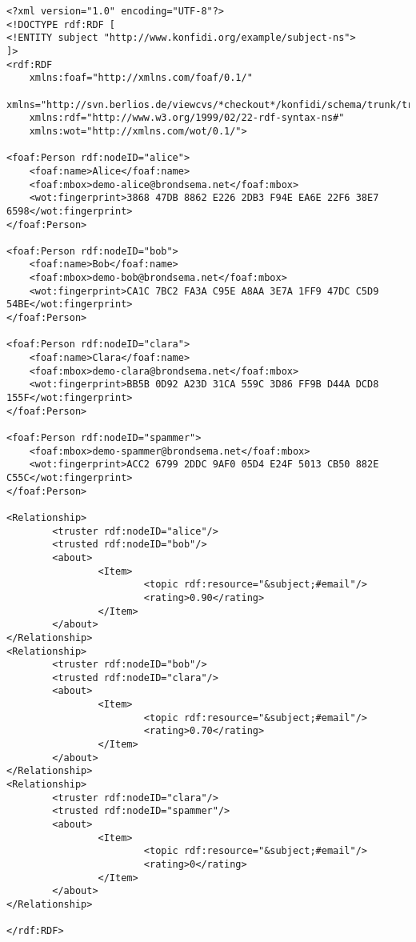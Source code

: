 \begin{verbatim}
<?xml version="1.0" encoding="UTF-8"?>
<!DOCTYPE rdf:RDF [
<!ENTITY subject "http://www.konfidi.org/example/subject-ns">
]>
<rdf:RDF
    xmlns:foaf="http://xmlns.com/foaf/0.1/"
    xmlns="http://svn.berlios.de/viewcvs/*checkout*/konfidi/schema/trunk/trust.owl#"
    xmlns:rdf="http://www.w3.org/1999/02/22-rdf-syntax-ns#"
    xmlns:wot="http://xmlns.com/wot/0.1/">

<foaf:Person rdf:nodeID="alice"> 
    <foaf:name>Alice</foaf:name>
    <foaf:mbox>demo-alice@brondsema.net</foaf:mbox>
    <wot:fingerprint>3868 47DB 8862 E226 2DB3 F94E EA6E 22F6 38E7 6598</wot:fingerprint>
</foaf:Person>

<foaf:Person rdf:nodeID="bob"> 
    <foaf:name>Bob</foaf:name>
    <foaf:mbox>demo-bob@brondsema.net</foaf:mbox>
    <wot:fingerprint>CA1C 7BC2 FA3A C95E A8AA 3E7A 1FF9 47DC C5D9 54BE</wot:fingerprint>
</foaf:Person>

<foaf:Person rdf:nodeID="clara"> 
    <foaf:name>Clara</foaf:name>
    <foaf:mbox>demo-clara@brondsema.net</foaf:mbox>
    <wot:fingerprint>BB5B 0D92 A23D 31CA 559C 3D86 FF9B D44A DCD8 155F</wot:fingerprint>
</foaf:Person>

<foaf:Person rdf:nodeID="spammer">
    <foaf:mbox>demo-spammer@brondsema.net</foaf:mbox>
    <wot:fingerprint>ACC2 6799 2DDC 9AF0 05D4 E24F 5013 CB50 882E C55C</wot:fingerprint>
</foaf:Person>

<Relationship>
        <truster rdf:nodeID="alice"/>
        <trusted rdf:nodeID="bob"/>
        <about>
                <Item>
                        <topic rdf:resource="&subject;#email"/>
                        <rating>0.90</rating>
                </Item>
        </about>
</Relationship>
<Relationship>
        <truster rdf:nodeID="bob"/>
        <trusted rdf:nodeID="clara"/>
        <about>
                <Item>
                        <topic rdf:resource="&subject;#email"/>
                        <rating>0.70</rating>
                </Item>
        </about>
</Relationship>
<Relationship>
        <truster rdf:nodeID="clara"/>
        <trusted rdf:nodeID="spammer"/>
        <about>
                <Item>
                        <topic rdf:resource="&subject;#email"/>
                        <rating>0</rating>
                </Item>
        </about>
</Relationship>

</rdf:RDF>
\end{verbatim}
